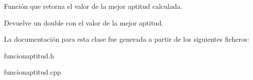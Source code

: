 Función que retorna el valor de la mejor aptitud calculada. 

\begin{DoxyReturn}{Devuelve}
un double con el valor de la mejor aptitud. 
\end{DoxyReturn}


La documentación para esta clase fue generada a partir de los siguientes ficheros\-:\begin{DoxyCompactItemize}
\item 
funcionaptitud.\-h\item 
funcionaptitud.\-cpp\end{DoxyCompactItemize}
